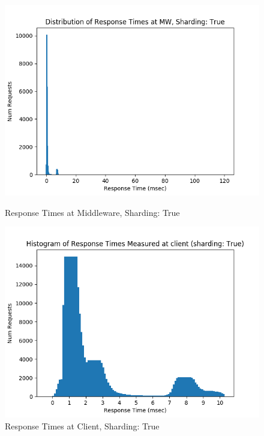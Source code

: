 \documentclass[11pt,a4paper]{article}
\begin{document}
\begin{figure}[H]
	\captionsetup{font=scriptsize,labelfont=scriptsize,justification=centering}
	\centering
	\begin{minipage}{0.5\textwidth}
		\centering
		\includegraphics[scale=0.525]{images/5_mw_hist_shard_True.png}
		\caption{Response Times at Middleware, Sharding: True}
	\end{minipage}\hfill
	\begin{minipage}{0.5\textwidth}
		\centering
		\includegraphics[scale=0.525]{images/5_mt_hist_shard_True.png}
		\caption{Response Times at Client, Sharding: True}
	\end{minipage}
\end{figure}
\end{document}
